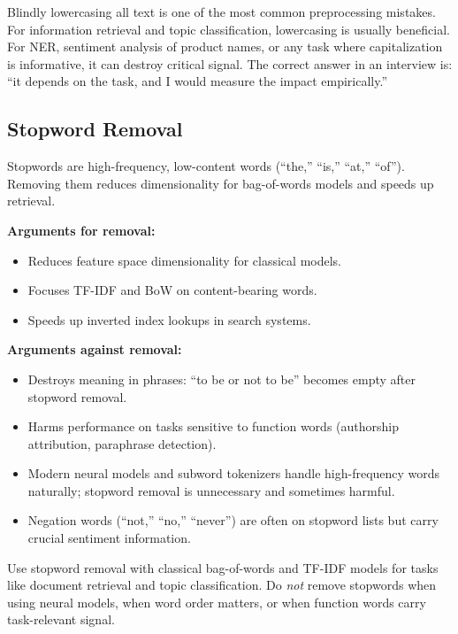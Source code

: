 \begin{warningbox}
Blindly lowercasing all text is one of the most common preprocessing mistakes. For
information retrieval and topic classification, lowercasing is usually beneficial. For
NER, sentiment analysis of product names, or any task where capitalization is informative,
it can destroy critical signal. The correct answer in an interview is: ``it depends on the
task, and I would measure the impact empirically.''
\end{warningbox}

\subsection{Stopword Removal}
\label{sec:stopword_removal}

Stopwords are high-frequency, low-content words (``the,'' ``is,'' ``at,'' ``of''). Removing
them reduces dimensionality for bag-of-words models and speeds up retrieval.

\textbf{Arguments for removal:}
\begin{itemize}
    \item Reduces feature space dimensionality for classical models.
    \item Focuses TF-IDF and BoW on content-bearing words.
    \item Speeds up inverted index lookups in search systems.
\end{itemize}

\textbf{Arguments against removal:}
\begin{itemize}
    \item Destroys meaning in phrases: ``to be or not to be'' becomes empty after stopword
    removal.
    \item Harms performance on tasks sensitive to function words (authorship attribution,
    paraphrase detection).
    \item Modern neural models and subword tokenizers handle high-frequency words naturally;
    stopword removal is unnecessary and sometimes harmful.
    \item Negation words (``not,'' ``no,'' ``never'') are often on stopword lists but carry
    crucial sentiment information.
\end{itemize}

\begin{keyinsight}
Use stopword removal with classical bag-of-words and TF-IDF models for tasks like document
retrieval and topic classification. Do \emph{not} remove stopwords when using neural
models, when word order matters, or when function words carry task-relevant signal.
\end{keyinsight}

